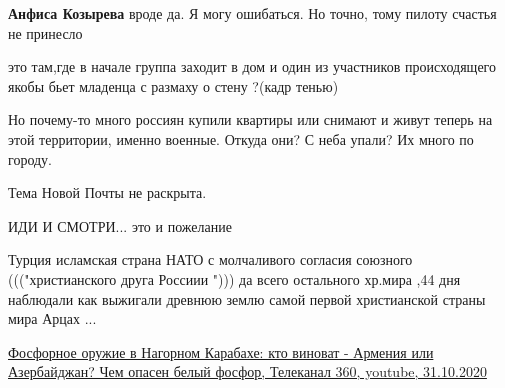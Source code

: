 \begin{itemize}
\begin{itemize}
\textbf{Анфиса Козырева} вроде да. Я могу ошибаться. Но точно, тому пилоту счастья не принесло
\end{itemize}

 
это там,где в начале группа заходит в дом
и один из участников происходящего якобы бьет младенца с размаху о стену ?(кадр тенью)

 

Но почему-то много россиян купили квартиры или снимают и живут теперь на этой
территории, именно военные. Откуда они? С неба упали? Их много по городу.


 
Тема Новой Почты не раскрыта.

 
ИДИ И СМОТРИ... это и пожелание

 

Турция исламская страна НАТО с молчаливого согласия союзного ((("христианского
друга Россиии "))) да всего остального хр.мира ,44 дня наблюдали как выжигали
древнюю землю самой первой христианской страны мира Арцах ...

\href{https://youtu.be/PYr32Jai7rg}{%
Фосфорное оружие в Нагорном Карабахе: кто виноват - Армения или Азербайджан? Чем опасен белый фосфор, %
Телеканал 360, youtube, 31.10.2020%
}


\end{itemize}
